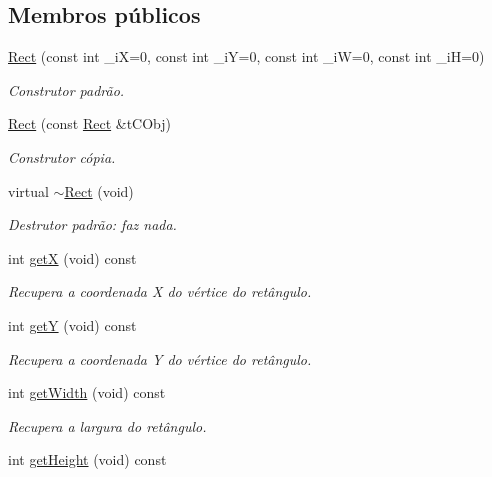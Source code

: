 \subsection*{Membros públicos}
\begin{DoxyCompactItemize}
\item 
\hyperlink{classMyRectangle_1_1Rect_a79919d6c530e7621f74600114a687807}{Rect} (const int \+\_\+iX=0, const int \+\_\+iY=0, const int \+\_\+iW=0, const int \+\_\+iH=0)
\begin{DoxyCompactList}\small\item\em Construtor padr\~{a}o. \end{DoxyCompactList}\item 
\hyperlink{classMyRectangle_1_1Rect_a670c36c53f8202760c739427e6c60d15}{Rect} (const \hyperlink{classMyRectangle_1_1Rect}{Rect} \&t\+C\+Obj)
\begin{DoxyCompactList}\small\item\em Construtor c\'{o}pia. \end{DoxyCompactList}\item 
virtual \hyperlink{classMyRectangle_1_1Rect_a173ff8091bb779df6789808de840c7ac}{$\sim$\+Rect} (void)
\begin{DoxyCompactList}\small\item\em Destrutor padr\~{a}o\+: faz nada. \end{DoxyCompactList}\item 
int \hyperlink{classMyRectangle_1_1Rect_a2140bde0d75740526912a14a13a8e2fb}{getX} (void) const 
\begin{DoxyCompactList}\small\item\em Recupera a coordenada X do v\'{e}rtice do ret\^{a}ngulo. \end{DoxyCompactList}\item 
int \hyperlink{classMyRectangle_1_1Rect_ade9a667c5d4848d70d5af4fb0b5aa7c6}{getY} (void) const 
\begin{DoxyCompactList}\small\item\em Recupera a coordenada Y do v\'{e}rtice do ret\^{a}ngulo. \end{DoxyCompactList}\item 
int \hyperlink{classMyRectangle_1_1Rect_ac9977b1c0b83ed00ca499e156d1ee600}{get\+Width} (void) const 
\begin{DoxyCompactList}\small\item\em Recupera a largura do ret\^{a}ngulo. \end{DoxyCompactList}\item 
int \hyperlink{classMyRectangle_1_1Rect_a03d99cdf45a3b25eac7f6d1f6d7a2db4}{get\+Height} (void) const 

\end{DoxyCompactItemize}
